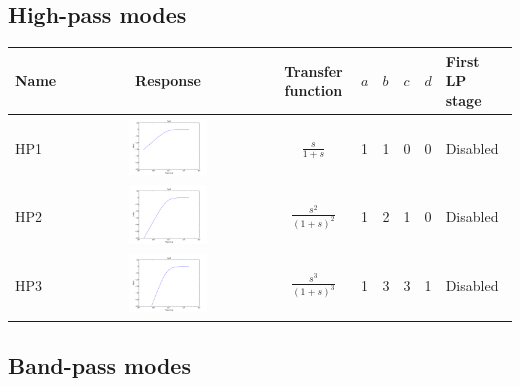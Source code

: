 \documentclass[a4paper,10pt]{article}
\begin{document}
\subsection{High-pass modes}

\begin{tabular}{lcclllll}
\hline
Name & Response & Transfer function & $a$ & $b$ & $c$ & $d$ & First LP stage \\
\hline
HP1 & \includegraphics[width=0.4\textwidth]{response_hp1.pdf} & $\frac{s}{1 + s}$ & 1 & 1 & 0 & 0 & Disabled \\
\hline
HP2 & \includegraphics[width=0.4\textwidth]{response_hp2.pdf} & $\frac{s^2}{(1 + s)^2}$ & 1 & 2 & 1 & 0 & Disabled \\
\hline
HP3 & \includegraphics[width=0.4\textwidth]{response_hp3.pdf} & $\frac{s^3}{(1 + s)^3}$ & 1 & 3 & 3 & 1 & Disabled \\
\hline
\end{tabular}

\subsection{Band-pass modes}
\end{document}
